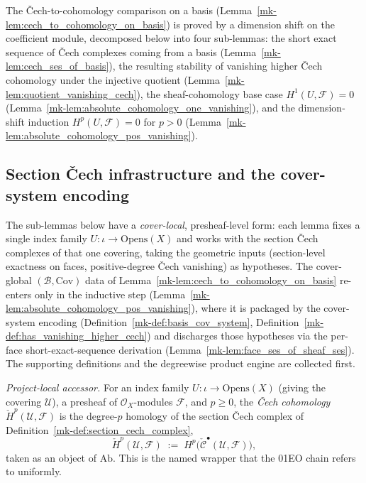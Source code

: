 The {\v C}ech-to-cohomology comparison on a basis
(Lemma~\ref{mk-lem:cech_to_cohomology_on_basis}) is proved by a dimension shift on the
coefficient module, decomposed below into four sub-lemmas: the short exact sequence of
{\v C}ech complexes coming from a basis (Lemma~\ref{mk-lem:cech_ses_of_basis}), the
resulting stability of vanishing higher {\v C}ech cohomology under the injective
quotient (Lemma~\ref{mk-lem:quotient_vanishing_cech}), the sheaf-cohomology base case
\(H^1(U, \mathcal{F}) = 0\) (Lemma~\ref{mk-lem:absolute_cohomology_one_vanishing}), and the
  dimension-shift induction \(H^p(U, \mathcal{F}) = 0\) for \(p > 0\)
  (Lemma~\ref{mk-lem:absolute_cohomology_pos_vanishing}).

\subsection{Section {\v C}ech infrastructure and the cover-system encoding}

The sub-lemmas below have a \emph{cover-local}, presheaf-level form: each lemma fixes
a single index family \(U : \iota \to \mathrm{Opens}(X)\) and works with the
section {\v C}ech complexes of that one covering, taking the geometric inputs (section-level
exactness on faces, positive-degree {\v C}ech vanishing) as hypotheses. The cover-global
\((\mathcal{B}, \mathrm{Cov})\) data of Lemma~\ref{mk-lem:cech_to_cohomology_on_basis} re-enters only
in the inductive step (Lemma~\ref{mk-lem:absolute_cohomology_pos_vanishing}), where it is packaged by
the cover-system encoding (Definition~\ref{mk-def:basis_cov_system},
Definition~\ref{mk-def:has_vanishing_higher_cech}) and discharges those hypotheses via the per-face
short-exact-sequence derivation (Lemma~\ref{mk-lem:face_ses_of_sheaf_ses}). The supporting
definitions and the degreewise product engine are collected first.

\begin{definition}\label{mk-def:cech_cohomology_accessor}
  \leanok

  \textit{Project-local accessor.}
  For an index family \(U : \iota \to \mathrm{Opens}(X)\) (giving the covering \(\mathcal{U}\)), a
  presheaf of \(\mathcal{O}_X\)-modules \(\mathcal{F}\), and \(p \geq 0\), the \emph{{\v C}ech
  cohomology} \(\check{H}^p(\mathcal{U}, \mathcal{F})\) is the degree-\(p\) homology of the section
  {\v C}ech complex of Definition~\ref{mk-def:section_cech_complex},
  \[
    \check{H}^p(\mathcal{U}, \mathcal{F}) \;:=\;
      H^p\bigl(\check{\mathcal{C}}^\bullet(\mathcal{U}, \mathcal{F})\bigr),
  \]
  taken as an object of \(\mathrm{Ab}\). This is the named wrapper that the 01EO chain refers to
  uniformly.
\end{definition}

